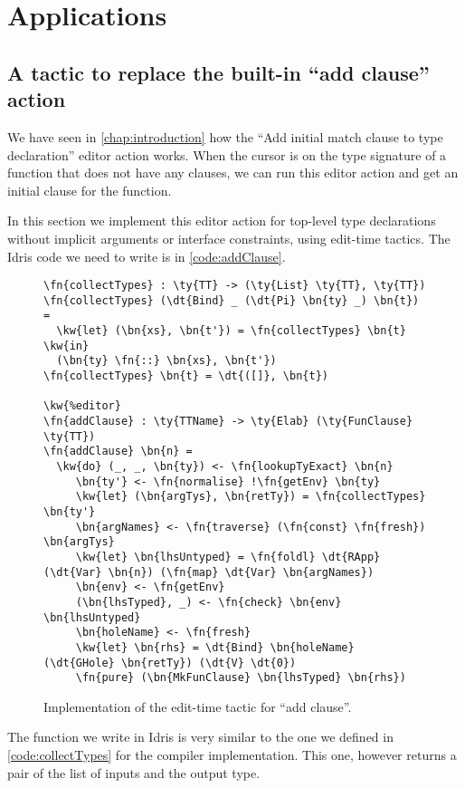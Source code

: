 \chapter{Applications} \label{chap:applications}

\section{A tactic to replace the built-in ``add clause'' action}\label{sec:addClause}

We have seen in \autoref{chap:introduction} how the ``Add initial match clause
to type declaration'' editor action works. When the cursor is on the type
signature of a function that does not have any clauses, we can run this editor
action and get an initial clause for the function.

In this section we implement this editor action for top-level type declarations
without implicit arguments or interface constraints, using edit-time tactics.
The Idris code we need to write is in \autoref{code:addClause}.

\begin{figure}[ht]
\caption{Implementation of the edit-time tactic for ``add clause''.}
\label{code:addClause}
\begin{Verbatim}[framesep=2mm, label=\footnotesize{\normalfont{Idris}}, labelposition=topline]
\fn{collectTypes} : \ty{TT} -> (\ty{List} \ty{TT}, \ty{TT})
\fn{collectTypes} (\dt{Bind} _ (\dt{Pi} \bn{ty} _) \bn{t}) =
  \kw{let} (\bn{xs}, \bn{t'}) = \fn{collectTypes} \bn{t} \kw{in}
  (\bn{ty} \fn{::} \bn{xs}, \bn{t'})
\fn{collectTypes} \bn{t} = \dt{([]}, \bn{t})

\kw{%editor}
\fn{addClause} : \ty{TTName} -> \ty{Elab} (\ty{FunClause} \ty{TT})
\fn{addClause} \bn{n} =
  \kw{do} (_, _, \bn{ty}) <- \fn{lookupTyExact} \bn{n}
     \bn{ty'} <- \fn{normalise} !\fn{getEnv} \bn{ty}
     \kw{let} (\bn{argTys}, \bn{retTy}) = \fn{collectTypes} \bn{ty'}
     \bn{argNames} <- \fn{traverse} (\fn{const} \fn{fresh}) \bn{argTys}
     \kw{let} \bn{lhsUntyped} = \fn{foldl} \dt{RApp} (\dt{Var} \bn{n}) (\fn{map} \dt{Var} \bn{argNames})
     \bn{env} <- \fn{getEnv}
     (\bn{lhsTyped}, _) <- \fn{check} \bn{env} \bn{lhsUntyped}
     \bn{holeName} <- \fn{fresh}
     \kw{let} \bn{rhs} = \dt{Bind} \bn{holeName} (\dt{GHole} \bn{retTy}) (\dt{V} \dt{0})
     \fn{pure} (\bn{MkFunClause} \bn{lhsTyped} \bn{rhs})
\end{Verbatim}
\end{figure}

The  function we write in Idris is very similar to the one we
defined in \autoref{code:collectTypes} for the compiler implementation.
This one, however returns a pair of the list of inputs and the output type.

